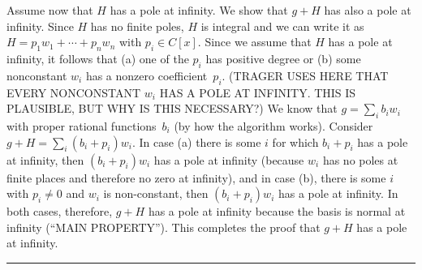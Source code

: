 \documentclass[a4paper,draft]{article}
\begin{document}
Assume now that $H$ has a pole at infinity. We show that $g+H$ has also a pole at infinity.
Since $H$ has no finite poles, $H$ is integral and we can write it as
$H=p_1w_1+\cdots+p_nw_n$ with $p_i\in C[x]$.
Since we assume that $H$ has a pole at infinity, it follows that (a) one of the $p_i$ has positive degree
or (b) some nonconstant $w_i$ has a nonzero coefficient~$p_i$.
(TRAGER USES HERE THAT EVERY NONCONSTANT $w_i$ HAS A POLE AT INFINITY. THIS IS PLAUSIBLE, BUT
WHY IS THIS NECESSARY?)
We know that $g=\sum_i b_iw_i$ with proper rational functions~$b_i$ (by how the algorithm works).
Consider $g+H=\sum_i (b_i+p_i)w_i$.
In case (a) there is some $i$ for which $b_i+p_i$ has a pole at infinity, then $(b_i+p_i)w_i$ has a pole
at infinity (because $w_i$ has no poles at finite places and therefore no zero at infinity),
and in case (b), there is some $i$ with $p_i\neq 0$ and $w_i$ is non-constant, then $(b_i+p_i)w_i$ has a
pole at infinity.
In both cases, therefore, $g+H$ has a pole at infinity because the basis is normal
at infinity (``MAIN PROPERTY'').
This completes the proof that $g+H$ has a pole at infinity. \rule{1ex}{1ex}
\end{document}

